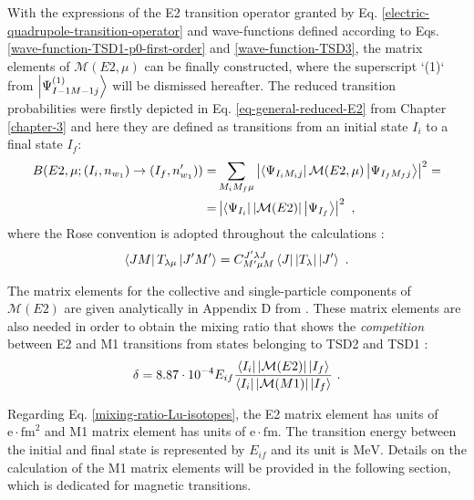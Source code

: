 With the expressions of the E2 transition operator granted by Eq. \ref{electric-quadrupole-transition-operator} and wave-functions defined according to Eqs. \ref{wave-function-TSD1-p0-first-order} and \ref{wave-function-TSD3}, the matrix elements of $\mathcal{M}(E2,\mu)$ can be finally constructed, where the superscript `(1)` from $\ket{\Psi_{I-1M-1j}^{(1)}}$ will be dismissed hereafter. The reduced transition probabilities were firstly depicted in Eq. \ref{eq-general-reduced-E2} from Chapter \ref{chapter-3} and here they are defined as transitions from an initial state $I_i$ to a final state $I_f$:
\begin{align}
    B(E2,\mu;(I_i,n_{w_1})\to(I_f,n'_{w_1}))=&\sum_{M_iM_f\mu}\left|\bra{\Psi_{I_iM_ij}}\mathcal{M}(E2,\mu)\ket{\Psi_{I_fM_fj}}\right|^2=\nonumber\\
                                            =&\left|\bra{\Psi_{I_i}}\left|\mathcal{M}(E2)\right|\ket{\Psi_{I_f}}\right|^2\ ,
\end{align}
where the Rose convention is adopted throughout the calculations \cite{rose1995elementary}:
\begin{align}
    \bra{JM}T_{\lambda\mu}\ket{J'M'}=C_{M'\mu M}^{J'\lambda J}\bra{J}|T_\lambda|\ket{J'}\ .
    \label{rose-convention}
\end{align}

The matrix elements for the collective and single-particle components of $\mathcal{M}(E2)$ are given analytically in Appendix D from \cite{raduta2017semiclassical}. These matrix elements are also needed in order to obtain the mixing ratio that shows the \emph{competition} between E2 and M1 transitions from states belonging to TSD2 and TSD1 \cite{krane1970determination,toki1975asymmetric}:
\begin{align}
    \delta=8.87\cdot 10^{-4}E_{if}\frac{\bra{I_i}|\mathcal{M}(E2)|\ket{I_f}}{\bra{I_i}|\mathcal{M}(M1)|\ket{I_f}}\ .
    \label{mixing-ratio-Lu-isotopes}
\end{align}

Regarding Eq. \ref{mixing-ratio-Lu-isotopes}, the E2 matrix element has units of $\mathrm{e}\cdot\text{fm}^2$ and M1 matrix element has units of $\mathrm{e}\cdot\text{fm}$. The transition energy between the initial and final state is represented by $E_{if}$ and its unit is $\text{MeV}$. Details on the calculation of the M1 matrix elements will be provided in the following section, which is dedicated for magnetic transitions.


